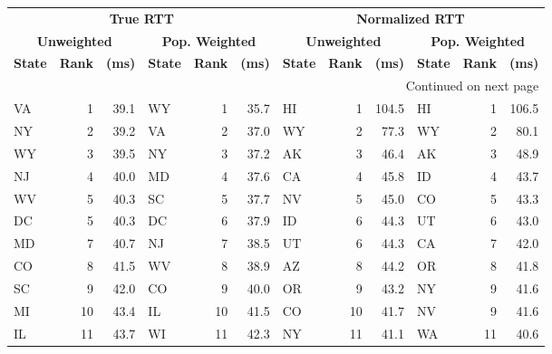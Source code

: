 \begin{longtable}{lrr|lrr||lrr|lrr}
  \multicolumn{6}{c||}{\textbf{True RTT}} & \multicolumn{6}{c}{\textbf{Normalized RTT}} \\
\multicolumn{3}{c|}{\textbf{Unweighted}} & \multicolumn{3}{c||}{\textbf{Pop. Weighted}} & \multicolumn{3}{c|}{\textbf{Unweighted}} & \multicolumn{3}{c||}{\textbf{Pop. Weighted}} \\
     \textbf{State} & \textbf{Rank} & \textbf{(ms)} & \textbf{State} & \textbf{Rank} & \textbf{(ms)} &\textbf{State} & \textbf{Rank} & \textbf{(ms)} &\textbf{State} & \textbf{Rank} & \textbf{(ms)} \\
\midrule
\endhead
\midrule
\multicolumn{12}{r}{{Continued on next page}} \\
\midrule
\endfoot
\bottomrule
\endlastfoot
        VA &    1 &   39.1 &            WY &    1 &  35.7 &             HI &    1 &  104.5 &            HI &    1 &  106.5 \\
        NY &    2 &   39.2 &            VA &    2 &  37.0 &             WY &    2 &   77.3 &            WY &    2 &   80.1 \\
        WY &    3 &   39.5 &            NY &    3 &  37.2 &             AK &    3 &   46.4 &            AK &    3 &   48.9 \\
        NJ &    4 &   40.0 &            MD &    4 &  37.6 &             CA &    4 &   45.8 &            ID &    4 &   43.7 \\
        WV &    5 &   40.3 &            SC &    5 &  37.7 &             NV &    5 &   45.0 &            CO &    5 &   43.3 \\
        DC &    5 &   40.3 &            DC &    6 &  37.9 &             ID &    6 &   44.3 &            UT &    6 &   43.0 \\
        MD &    7 &   40.7 &            NJ &    7 &  38.5 &             UT &    6 &   44.3 &            CA &    7 &   42.0 \\
        CO &    8 &   41.5 &            WV &    8 &  38.9 &             AZ &    8 &   44.2 &            OR &    8 &   41.8 \\
        SC &    9 &   42.0 &            CO &    9 &  40.0 &             OR &    9 &   43.2 &            NY &    9 &   41.6 \\
        MI &   10 &   43.4 &            IL &   10 &  41.5 &             CO &   10 &   41.7 &            NV &    9 &   41.6 \\
        IL &   11 &   43.7 &            WI &   11 &  42.3 &             NY &   11 &   41.1 &            WA &   11 &   40.6 \\

\end{longtable}
